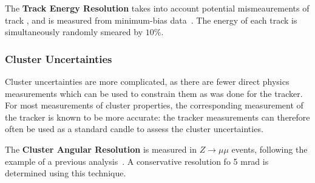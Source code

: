	The \textbf{Track Energy Resolution} takes into account potential mismeaurements of track \pt, and is measured from minimum-bias data~\cite{ATLASCharged}. The energy of each track is simultaneously randomly smeared by $10\%$. 

	\subsubsection{Cluster Uncertainties}
	\label{chapter:color:uncertainties:clusters}

	Cluster uncertainties are more complicated, as there are fewer direct physics measurements which can be used to constrain them as was done for the tracker. For most measurements of cluster properties, the corresponding measurement of the tracker is known to be more accurate: the tracker measurements can therefore often be used as a standard candle to assess the cluster uncertainties.


	The \textbf{Cluster Angular Resolution} is measured in $Z\rightarrow \mu\mu$ events, following the example of a previous analysis~\cite{Begel:1290956}. A conservative resolution fo 5 mrad is determined using this technique.  %


